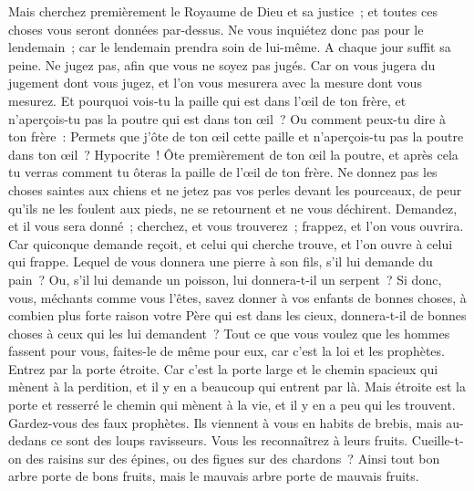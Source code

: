 \begin{multicols}{2}
Mais cherchez premièrement le Royaume de Dieu et sa justice~; et toutes ces choses vous seront données par-dessus.
Ne vous inquiétez donc pas pour le lendemain~; car le lendemain prendra soin de lui-même. A chaque jour suffit sa peine.
\VerseOne{}Ne jugez pas, afin que vous ne soyez pas jugés.
Car on vous jugera du jugement dont vous jugez, et l'on vous mesurera avec la mesure dont vous mesurez.
Et pourquoi vois-tu la paille qui est dans l'œil de ton frère, et n'aperçois-tu pas la poutre qui est dans ton œil~?
Ou comment peux-tu dire à ton frère~: Permets que j'ôte de ton œil cette paille et n'aperçois-tu pas la poutre dans ton œil~?
Hypocrite~! Ôte premièrement de ton œil la poutre, et après cela tu verras comment tu ôteras la paille de l'œil de ton frère.
Ne donnez pas les choses saintes aux chiens et ne jetez pas vos perles devant les pourceaux, de peur qu'ils ne les foulent aux pieds, ne se retournent et ne vous déchirent.
Demandez, et il vous sera donné~; cherchez, et vous trouverez~; frappez, et l'on vous ouvrira.
Car quiconque demande reçoit, et celui qui cherche trouve, et l'on ouvre à celui qui frappe.
Lequel de vous donnera une pierre à son fils, s'il lui demande du pain~?
Ou, s'il lui demande un poisson, lui donnera-t-il un serpent~?
Si donc, vous, méchants comme vous l'êtes, savez donner à vos enfants de bonnes choses, à combien plus forte raison votre Père qui est dans les cieux, donnera-t-il de bonnes choses à ceux qui les lui demandent~?
Tout ce que vous voulez que les hommes fassent pour vous, faites-le de même pour eux, car c'est la loi et les prophètes.
Entrez par la porte étroite. Car c'est la porte large et le chemin spacieux qui mènent à la perdition, et il y en a beaucoup qui entrent par là.
Mais étroite est la porte et resserré le chemin qui mènent à la vie, et il y en a peu qui les trouvent.
Gardez-vous des faux prophètes. Ils viennent à vous en habits de brebis, mais au-dedans ce sont des loups ravisseurs.
Vous les reconnaîtrez à leurs fruits. Cueille-t-on des raisins sur des épines, ou des figues sur des chardons~?
Ainsi tout bon arbre porte de bons fruits, mais le mauvais arbre porte de mauvais fruits.

\end{multicols}
